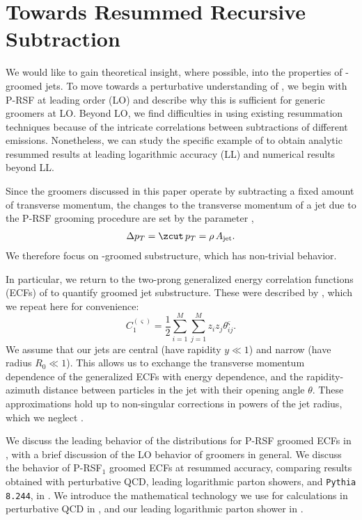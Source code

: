 \section{Towards Resummed Recursive Subtraction}
\label{app:calc}
We would like to gain theoretical insight, where possible, into the properties of \PIRANHA{}-groomed jets.
%
To move towards a perturbative understanding of \PIRANHA{}, we begin with P-RSF at leading order (LO) and describe why this is sufficient for generic \PIRANHA{} groomers at LO.
%
Beyond LO, we find difficulties in using existing resummation techniques because of the intricate correlations between subtractions of different emissions.
%
Nonetheless, we can study the specific example of  to obtain analytic resummed results at leading logarithmic accuracy (LL) and numerical results beyond LL.

Since the \PIRANHA{} groomers discussed in this paper operate by subtracting a fixed amount of transverse momentum, the changes to the transverse momentum of a jet due to the P-RSF grooming procedure are set by the parameter \zcut{},
\begin{align}
    \Delta p_T = \zcut\,p_T = \rho\,A_{\rm jet}
    .
\end{align}
%
We therefore focus on \PIRANHA{}-groomed substructure, which has non-trivial behavior.

In particular, we return to the two-prong generalized energy correlation functions (ECFs) of  to quantify groomed jet substructure.
%
These were described by , which we repeat here for convenience:
\begin{equation}
    C_1^{(\varsigma)} = \frac{1}{2}\sum_{i=1}^M\sum_{j=1}^M z_i z_j \theta_{ij}^\varsigma
    \label{eqn:ECFdefn_repeat}
    .
\end{equation}
We assume that our jets are central (have rapidity \(y \ll 1\)) and narrow (have radius \(R_0 \ll 1\)).
%
This allows us to exchange the transverse momentum dependence of the generalized ECFs with energy dependence, and the rapidity-azimuth distance between particles in the jet with their opening angle \(\theta\).
%
These approximations hold up to non-singular corrections in powers of the jet radius, which we neglect \cite{Larkoski:2014wba}.

We discuss the leading behavior of the distributions for P-RSF groomed ECFs in , with a brief discussion of the LO behavior of \PIRANHA{} groomers in general.
%
We discuss the behavior of P-RSF\(_{1}\) groomed ECFs at resummed accuracy, comparing results obtained with perturbative QCD, leading logarithmic parton showers, and \texttt{Pythia 8.244}, in .
%
We introduce the mathematical technology we use for calculations in perturbative QCD in , and our leading logarithmic parton shower in .


